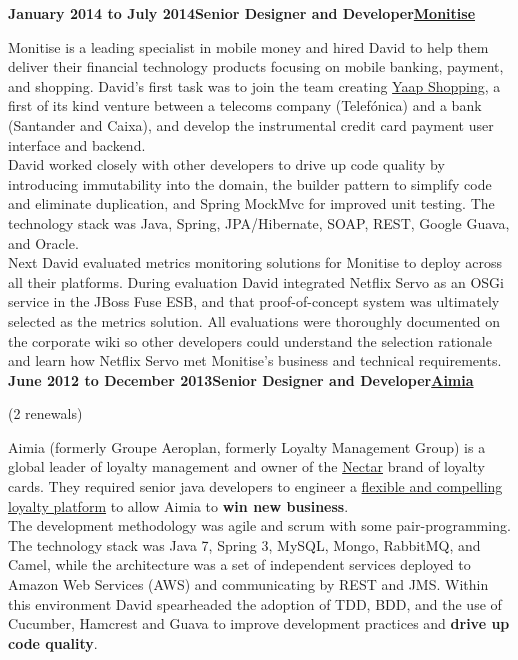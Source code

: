 \documentclass[a4paper,12pt]{article}
\newcommand{\head}[1]{\begin{center}{\large{\textbf{\sc{#1}}}}\nopagebreak\end{center}}
\newcommand{\clientwork}[3]{\textbf{#1\hfill#3\hfill#2}\nopagebreak}
\newcommand{\renewals}[2]{(#2)\nopagebreak}
\begin{document}
\head{Career History}

\clientwork{January 2014 to July 2014}{\href{http://www.monitise.com/}{Monitise}}{Senior Designer and Developer}

Monitise is a leading specialist in mobile money and hired David to help them deliver their financial technology products focusing on mobile banking, payment, and shopping. David's first task was to join the team creating \href{http://www.yaapshopping.com/}{Yaap Shopping}, a first of its kind venture between a telecoms company (Telef\'onica) and a bank (Santander and Caixa), and develop the instrumental credit card payment user interface and backend.\\

David worked closely with other developers to drive up code quality by introducing immutability into the domain, the builder pattern to simplify code and eliminate duplication, and Spring MockMvc for improved unit testing. The technology stack was Java, Spring, JPA/Hibernate, SOAP, REST, Google Guava, and Oracle.\\

Next David evaluated metrics monitoring solutions for Monitise to deploy across all their platforms. During evaluation David integrated Netflix Servo as an OSGi service in the JBoss Fuse ESB, and that proof-of-concept system was ultimately selected as the metrics solution. All evaluations were thoroughly documented on the corporate wiki so other developers could understand the selection rationale and learn how Netflix Servo met Monitise's business and technical requirements.\\

\clientwork{June 2012 to December 2013}{\href{http://www.aimia.com/}{Aimia}}{Senior Designer and Developer}

\renewals{18 months}{2 renewals}

Aimia (formerly Groupe Aeroplan, formerly Loyalty Management Group) is a global leader of loyalty management and owner of the \href{http://www.nectar.com/}{Nectar} brand of loyalty cards. They required senior java developers to engineer a \href{http://www.aimia.com/English/Services/Aimia-Systems/Loyalty-Platform}{flexible and compelling loyalty platform} to allow Aimia to \textbf{win new business}.\\

The development methodology was agile and scrum with some pair-programming.  The technology stack was Java 7, Spring 3, MySQL, Mongo, RabbitMQ, and Camel, while the architecture was a set of independent services deployed to Amazon Web Services (AWS) and communicating by REST and JMS. Within this environment David spearheaded the adoption of TDD, BDD, and the use of Cucumber, Hamcrest and Guava to improve development practices and \textbf{drive up code quality}.\\
\end{document}
